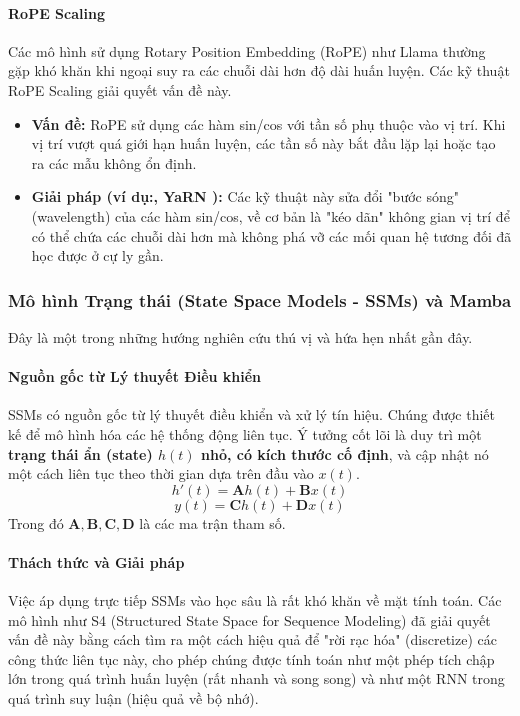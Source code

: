 \paragraph{RoPE Scaling}
Các mô hình sử dụng Rotary Position Embedding (RoPE) như Llama thường gặp khó khăn khi ngoại suy ra các chuỗi dài hơn độ dài huấn luyện. Các kỹ thuật RoPE Scaling giải quyết vấn đề này.
\begin{itemize}
    \item \textbf{Vấn đề:} RoPE sử dụng các hàm sin/cos với tần số phụ thuộc vào vị trí. Khi vị trí vượt quá giới hạn huấn luyện, các tần số này bắt đầu lặp lại hoặc tạo ra các mẫu không ổn định.
    \item \textbf{Giải pháp (ví dụ:\cite{bloc972023ntkaware}, YaRN \cite{peng2023yarn}):} Các kỹ thuật này sửa đổi "bước sóng" (wavelength) của các hàm sin/cos, về cơ bản là "kéo dãn" không gian vị trí để có thể chứa các chuỗi dài hơn mà không phá vỡ các mối quan hệ tương đối đã học được ở cự ly gần.
\end{itemize}
\subsubsection{Mô hình Trạng thái (State Space Models - SSMs) và Mamba}
Đây là một trong những hướng nghiên cứu thú vị và hứa hẹn nhất gần đây.

\paragraph{Nguồn gốc từ Lý thuyết Điều khiển}
SSMs có nguồn gốc từ lý thuyết điều khiển và xử lý tín hiệu. Chúng được thiết kế để mô hình hóa các hệ thống động liên tục. Ý tưởng cốt lõi là duy trì một \textbf{trạng thái ẩn (state) $h(t)$ nhỏ, có kích thước cố định}, và cập nhật nó một cách liên tục theo thời gian dựa trên đầu vào $x(t)$.
$$ h'(t) = \mathbf{A}h(t) + \mathbf{B}x(t) $$
$$ y(t) = \mathbf{C}h(t) + \mathbf{D}x(t) $$
Trong đó $\mathbf{A, B, C, D}$ là các ma trận tham số.

\paragraph{Thách thức và Giải pháp}
Việc áp dụng trực tiếp SSMs vào học sâu là rất khó khăn về mặt tính toán. Các mô hình như S4 (Structured State Space for Sequence Modeling) \cite{gu2021efficiently} đã giải quyết vấn đề này bằng cách tìm ra một cách hiệu quả để "rời rạc hóa" (discretize) các công thức liên tục này, cho phép chúng được tính toán như một phép tích chập lớn trong quá trình huấn luyện (rất nhanh và song song) và như một RNN trong quá trình suy luận (hiệu quả về bộ nhớ).

